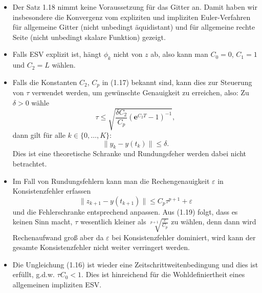 \documentclass{book}
\newcommand{\tmdummy}{$\mbox{}$}
\newenvironment{itemizedot}{\begin{itemize} \renewcommand{\labelitemi}{$\bullet$}\renewcommand{\labelitemii}{$\bullet$}\renewcommand{\labelitemiii}{$\bullet$}\renewcommand{\labelitemiv}{$\bullet$}}{\end{itemize}}
\begin{document}
\begin{remark*}
  {\tmdummy}
  
  \begin{itemizedot}
    \item Der Satz 1.18 nimmt keine Voraussetzung f{\"u}r das Gitter an. Damit
    haben wir insbesondere die Konvergenz vom expliziten und impliziten
    Euler-Verfahren f{\"u}r allgemeine Gitter (nicht unbedingt
    {\"a}quidistant) und f{\"u}r allgemeine rechte Seite (nicht unbedingt
    skalare Funktion) gezeigt.
    
    \item Falls ESV explizit ist, h{\"a}ngt $\phi_k$ nicht von $z$ ab, also
    kann man $C_0 = 0$, $C_1 = 1$ und $C_2 = L$ w{\"a}hlen.
    
    \item Falls die Konstanten $C_2$, $C_p$ in (1.17) bekannt sind, kann dies
    zur Steuerung von $\tau$ verwendet werden, um gew{\"u}nschte Genauigkeit
    zu erreichen, also: Zu $\delta > 0$ w{\"a}hle
    \[ \tau \leq \sqrt{\frac{\delta C_2}{C_p} (\mathbf{e}^{C_2 T} - 1)^{- 1}},
    \]
    dann gilt f{\"u}r alle $k \in \{ 0, \ldots, K \}$:
    \[ \parallel y_k - y (t_k) \parallel \leq \delta . \]
    Dies ist eine theoretische Schranke und Rundungsfeher werden dabei nicht
    betrachtet.
    
    \item Im Fall von Rundungsfehlern kann man die Rechengenauigkeit
    $\varepsilon$ in Konsistenzfehler erfassen
    \begin{equation}
      \parallel z_{k + 1} - y (t_{k + 1}) \parallel \leq C_p \tau^{p + 1} +
      \varepsilon
    \end{equation}
    und die Fehlerschranke entsprechend anpassen. Aus (1.19) folgt, dass es
    keinen Sinn macht, $\tau$ wesentlich kleiner als $ \sqrt[p +
    1]{\frac{\varepsilon}{C_p}}$ zu w{\"a}hlen, denn dann wird Rechenaufwand
    gro{\ss} aber da $\varepsilon$ bei Konsistenzfehler dominiert, wird kann
    der gesamte Konsistenzfehler nicht weiter verringert werden.
    
    \item Die Ungleichung (1.16) ist wieder eine Zeitschrittweitenbedingung
    und dies ist erf{\"u}llt, g.d.w. $\tau C_0 < 1$. Dies ist hinreichend
    f{\"u}r die Wohldefiniertheit eines allgemeinen impliziten ESV. 
  \end{itemizedot}
\end{remark*}

\
\end{document}
